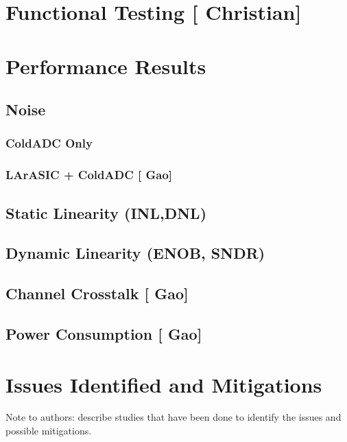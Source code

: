 \documentclass[10pt]{article}
\begin{document}

\section{Functional Testing [{\color{red} Christian}] }


	

\section{Performance Results}


\subsection{Noise}
\subsubsection{ColdADC Only}
\subsubsection{LArASIC + ColdADC  [{\color{red} Gao}] }


\subsection{Static Linearity (INL,DNL)}

\subsection{Dynamic Linearity (ENOB, SNDR)}

\subsection{Channel Crosstalk [{\color{red} Gao}] }


\subsection{Power Consumption [{\color{red} Gao}] }



\section{Issues Identified and Mitigations}
Note to authors: describe studies that have been done to identify the issues and possible mitigations.
\end{document}
